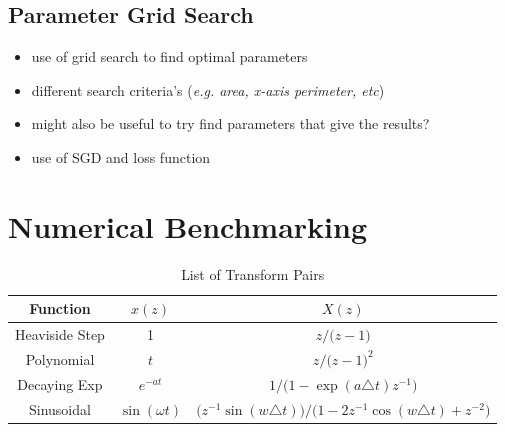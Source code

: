 \documentclass[a4paper]{report}
\begin{document}
\subsection{Parameter Grid Search}
\begin{itemize}
    \item use of grid search to find optimal parameters
    \item different search criteria's (\textit{e.g. area, x-axis perimeter, etc})
    \item might also be useful to try find parameters that give the results?
    \item use of SGD and loss function
\end{itemize}

\section{Numerical Benchmarking}


\begin{table}[h]
    \centering
    \begin{tabular}{c|cc}
    \hline
    \textbf{Function} & $x(z)$ & $X(z)$ \\
    \hline
    Heaviside Step & 1 & $z / \textbf{(}z-1\textbf{)}$ \\
    Polynomial & \(t\) & $z / \textbf{(}z-1\textbf{)}^2 $ \\
    Decaying Exp & $e^{-at}$ & $1 / \textbf{(}1 - \exp(a\triangle t) z^{-1}\textbf{)}$ \\
    Sinusoidal & $\sin(\omega t)$ & $\textbf{(}z^{-1}\sin(w\triangle t)\textbf{)} / \textbf{(}1-2z^{-1}\cos(w\triangle t) + z^{-2}\textbf{)}$
    \end{tabular}
    \caption{List of Transform Pairs}
    \label{tab:transform_pairs}
\end{table}
\end{document}
